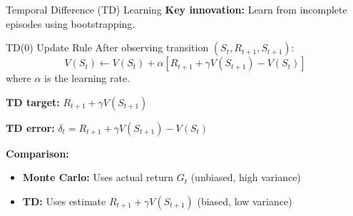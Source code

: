 \documentclass[aspectratio=169]{beamer}
\begin{document}
\begin{frame}{Temporal Difference (TD) Learning}
  \textbf{Key innovation:} Learn from incomplete episodes using bootstrapping.

  \vspace{0.5em}

  \begin{definitionbox}{TD(0) Update Rule}
    After observing transition $(S_t, R_{t+1}, S_{t+1})$:
    $$V(S_t) \leftarrow V(S_t) + \alpha[R_{t+1} + \gamma V(S_{t+1}) - V(S_t)]$$
    where $\alpha$ is the learning rate.
  \end{definitionbox}

  \vspace{0.5em}

  \textbf{TD target:} $R_{t+1} + \gamma V(S_{t+1})$

  \textbf{TD error:} $\delta_t = R_{t+1} + \gamma V(S_{t+1}) - V(S_t)$

  \vspace{0.5em}

  \textbf{Comparison:}
  \begin{itemize}
    \item \textbf{Monte Carlo:} Uses actual return $G_t$ (unbiased, high variance)
    \item \textbf{TD:} Uses estimate $R_{t+1} + \gamma V(S_{t+1})$ (biased, low variance)
  \end{itemize}
\end{frame}
\end{document}
